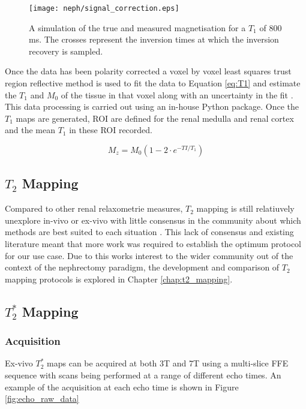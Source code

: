 \begin{figure}[H]
	\centering
	\texttt{[image: neph/signal\_correction.eps]}
	\caption{A simulation of the true and measured magnetisation for a $T_1$ of 800 ms. The crosses represent the inversion times at which the inversion recovery is sampled.}
	\label{fig:sig_correction}	
\end{figure}

Once the data has been polarity corrected a voxel by voxel least squares trust region reflective  method is used to fit the data to Equation \eqref{eq:T1} and estimate the $T_1$ and $M_0$ of the tissue in that voxel along with an uncertainty in the fit \cite{branch_subspace_1999}. This data processing is carried out using an in-house Python package. Once the $T_1$ maps are generated, \ac{ROI} are defined for the renal medulla and renal cortex and the mean $T_1$ in these \ac{ROI} recorded.

\begin{equation}
M_z = M_0 \left(1-2\cdot e^{-TI/T_1}\right)
\label{eq:T1}
\end{equation}

\subsection{$T_2$ Mapping}
\label{subsec:neph_t2_mapping}

Compared to other renal relaxometrie measures, $T_2$ mapping is still relatiuvely unexplore in-vivo or ex-vivo with little consensus in the community about which methods are best suited to each situation \cite{dekkers_consensus-based_2019}. This lack of consensus and existing literature meant that more work was required to establish the optimum protocol for our use case. Due to this works interest to the wider community out of the context of the nephrectomy paradigm, the development and comparison of $T_2$ mapping protocols is explored in Chapter \ref{chap:t2_mapping}.

\subsection{$T_2^*$ Mapping}
\subsubsection{Acquisition}

Ex-vivo $T_2^*$ maps can be acquired at both 3T and 7T using a multi-slice \ac{FFE} sequence with scans being performed at a range of different echo times. An example of the acquisition at each echo time is shown in Figure \ref{fig:echo_raw_data}


